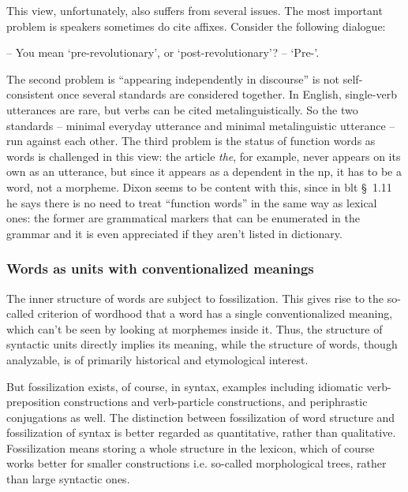 \documentclass[UTF8, a4paper, oneside, scheme=plain]{ctexart}
\newcommand*{\citesec}[1]{\S~{#1}}
\newcommand*{\corpus}[1]{\emph{#1}}
\def\\{}%
\begin{document}
This view, unfortunately, also suffers from several issues.
The most important problem is speakers sometimes do cite affixes.
Consider the following dialogue:
\begin{exe}
    \ex\label{ex:affix-real} -- You mean `pre-revolutionary', or `post-revolutionary'? \\
    -- `Pre-'.
\end{exe}
The second problem is ``appearing independently in discourse''
is not self-consistent
once several standards are considered together.
In English, single-verb utterances are rare,
but verbs can be cited metalinguistically.
So the two standards -- minimal everyday utterance and minimal metalinguistic utterance -- 
run against each other.
The third problem is the status of function words as words is challenged in this view:
the article \corpus{the}, 
for example, never appears on its own as an utterance,
but since it appears as a dependent in the \ac{np},
it has to be a word, not a morpheme.
Dixon seems to be content with this,
since in \ac{blt} \citesec{1.11} he says there is no need to treat 
``function words'' in the same way as lexical ones:
the former are grammatical markers that can be enumerated in the grammar
and it is even appreciated if they aren't listed in dictionary.

\subsubsection{Words as units with conventionalized meanings}\label{sec:word-meaning}

The inner structure of words are subject to fossilization.
This gives rise to the so-called criterion of wordhood 
that a word has a single conventionalized meaning,
which can't be seen by looking at morphemes inside it.
Thus, the structure of syntactic units directly implies its meaning,
while the structure of words,
though analyzable,
is of primarily historical and etymological interest.

But fossilization exists, of course, in syntax,
examples including idiomatic verb-preposition constructions 
and verb-particle constructions,
and periphrastic conjugations as well.
The distinction between fossilization of word structure and fossilization of syntax 
is better regarded as quantitative, rather than qualitative.
Fossilization means storing a whole structure in the lexicon,
which of course works better for smaller constructions i.e. so-called morphological trees,
rather than large syntactic ones.
\end{document}

